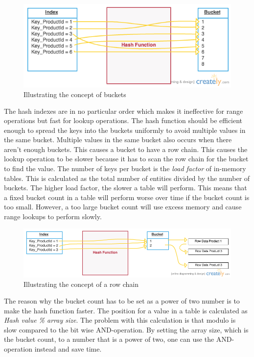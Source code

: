 \documentclass{cslthse-msc}
\begin{document}
\begin{figure}[H]
\begin{center}
\includegraphics[scale=0.5]{Pictures/buckets.png}
\caption{Illustrating the concept of buckets}
\end{center}
\end{figure}

The hash indexes are in no particular order which makes it ineffective for range operations but fast for lookup operations. The hash function should be efficient enough to spread the keys into the buckets uniformly to avoid multiple values in the same bucket. Multiple values in the same bucket also occurs when there aren't enough buckets. This causes a bucket to have a row chain. This causes the lookup operation to be slower because it has to scan the row chain for the bucket to find the value. The number of keys per bucket is the \emph{load factor} of in-memory tables. This is calculated as the total number of entities divided by the number of buckets. The higher load factor, the slower a table will perform. This means that a fixed bucket count in a table will perform worse over time if the bucket count is too small. However, a too large bucket count will use excess memory and cause range lookups to perform slowly. 

\begin{figure}[H]
\begin{center}
\includegraphics[scale=0.5]{Pictures/buckets2.png}
\caption{Illustrating the concept of a row chain}
\end{center}
\end{figure}

The reason why the bucket count has to be set as a power of two number is to make the hash function faster. The position for a value in a table is calculated as \emph{Hash value \% array size}. The problem with this calculation is that modulo is slow compared to the bit wise AND-operation. By setting the array size, which is the bucket count, to a number that is a power of two, one can use the AND-operation instead and save time.
\end{document}

